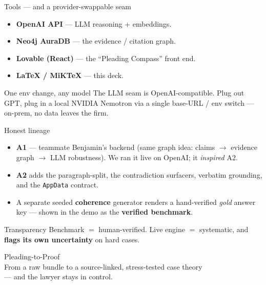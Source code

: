 \documentclass[aspectratio=169,10pt]{beamer}
\begin{document}
\begin{frame}{Tools --- and a provider-swappable seam}
  \begin{itemize}
    \item \textbf{OpenAI API} --- LLM reasoning + embeddings.
    \item \textbf{Neo4j AuraDB} --- the evidence / citation graph.
    \item \textbf{Lovable (React)} --- the ``Pleading Compass'' front end.
    \item \textbf{LaTeX / MiKTeX} --- this deck.
  \end{itemize}
  \medskip
  \begin{block}{One env change, any model}
    The LLM seam is OpenAI-compatible. \alert{Plug out GPT, plug in a local
    NVIDIA Nemotron} via a single base-URL / env switch --- on-prem, no data
    leaves the firm.
  \end{block}
\end{frame}

\begin{frame}{Honest lineage}
  \begin{itemize}
    \item \textbf{A1} --- teammate Benjamin's backend (same graph idea:
          claims $\rightarrow$ evidence graph $\rightarrow$ LLM robustness). We
          ran it live on OpenAI; it \emph{inspired} A2.
    \item \textbf{A2} adds the paragraph-split, the contradiction surfacers,
          verbatim grounding, and the \texttt{AppData} contract.
    \item A separate seeded \textbf{coherence} generator renders a
          hand-verified \emph{gold} answer key --- shown in the demo as the
          \textbf{verified benchmark}.
  \end{itemize}
  \medskip
  \begin{alertblock}{Transparency}
    Benchmark $=$ human-verified. \quad Live engine $=$ systematic, and
    \textbf{flags its own uncertainty} on hard cases.
  \end{alertblock}
\end{frame}

\begin{frame}[standout]
  Pleading-to-Proof\\[4pt]
  \normalsize From a raw bundle to a source-linked, stress-tested case theory\\
  --- and the lawyer stays in control.
\end{frame}
\end{document}
